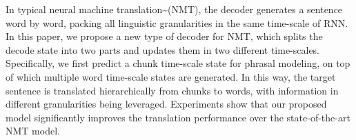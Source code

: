 In typical neural machine translation{\textasciitilde}(NMT), the decoder generates a sentence word by word, packing all linguistic granularities in the same time-scale of RNN. In this paper, we propose a new type of decoder for NMT, which splits the decode state into two parts and updates them in two different time-scales. Specifically, we first predict a chunk time-scale state for phrasal modeling, on top of which multiple word time-scale states are generated. In this way, the target sentence is translated hierarchically from chunks to words, with information in different granularities being leveraged. Experiments show that our proposed model significantly improves the translation performance over the state-of-the-art NMT model.
